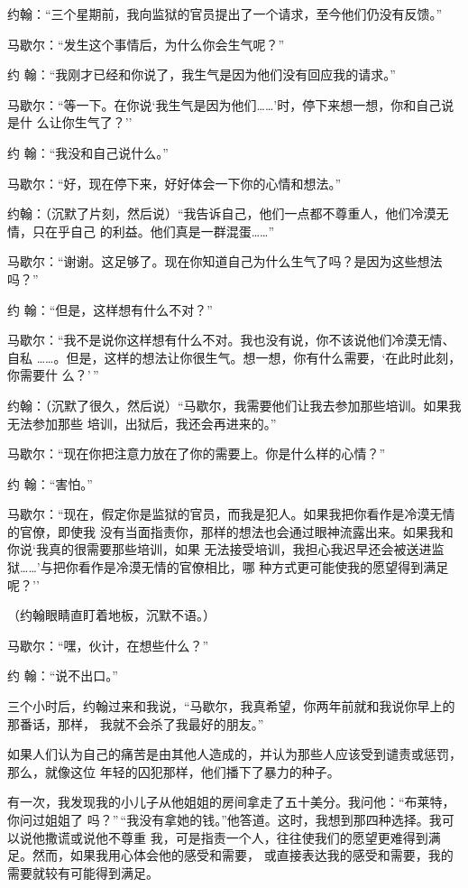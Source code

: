 \documentclass{ctexart}
\renewenvironment{quotation}{\setlength{\parskip}{0.5em}\setstretch{1.5}\kaishu\zihao{-5}\setlength{\parindent}{1em}}{\vspace{1em}}
\begin{document}
\begin{quotation}
	约翰：``三个星期前，我向监狱的官员提出了一个请求，至今他们仍没有反馈。''

	马歇尔：``发生这个事情后，为什么你会生气呢？''

	约 翰：``我刚才已经和你说了，我生气是因为他们没有回应我的请求。''

	马歇尔：``等一下。在你说`我生气是因为他们\ldots\ldots'时，停下来想一想，你和自己说是什
	么让你生气了？''

	约 翰：``我没和自己说什么。''

	马歇尔：``好，现在停下来，好好体会一下你的心情和想法。''

	约翰：（沉默了片刻，然后说）``我告诉自己，他们一点都不尊重人，他们冷漠无情，只在乎自己
	的利益。他们真是一群混蛋\ldots\ldots''

	马歇尔：``谢谢。这足够了。现在你知道自己为什么生气了吗？是因为这些想法吗？''

	约 翰：``但是，这样想有什么不对？''

	马歇尔：``我不是说你这样想有什么不对。我也没有说，你不该说他们冷漠无情、自私
	\ldots\ldots。但是，这样的想法让你很生气。想一想，你有什么需要，`在此时此刻，你需要什
	么？'\,''

	约翰：（沉默了很久，然后说）``马歇尔，我需要他们让我去参加那些培训。如果我无法参加那些
	培训，出狱后，我还会再进来的。''

	马歇尔：``现在你把注意力放在了你的需要上。你是什么样的心情？''

	约 翰：``害怕。''

	马歇尔：``现在，假定你是监狱的官员，而我是犯人。如果我把你看作是冷漠无情的官僚，即使我
	没有当面指责你，那样的想法也会通过眼神流露出来。如果我和你说`我真的很需要那些培训，如果
	无法接受培训，我担心我迟早还会被送进监狱\ldots\ldots'与把你看作是冷漠无情的官僚相比，哪
	种方式更可能使我的愿望得到满足呢？''

	（约翰眼睛直盯着地板，沉默不语。）

	马歇尔：``嘿，伙计，在想些什么？''

	约 翰：``说不出口。''
\end{quotation}

三个小时后，约翰过来和我说，``马歇尔，我真希望，你两年前就和我说你早上的那番话，那样，
我就不会杀了我最好的朋友。''

如果人们认为自己的痛苦是由其他人造成的，并认为那些人应该受到谴责或惩罚，那么，就像这位
年轻的囚犯那样，他们播下了暴力的种子。

有一次，我发现我的小儿子从他姐姐的房间拿走了五十美分。我问他：``布莱特，你问过姐姐了
吗？''\,``我没有拿她的钱。''他答道。这时，我想到那四种选择。我可以说他撒谎或说他不尊重
我，可是指责一个人，往往使我们的愿望更难得到满足。然而，如果我用心体会他的感受和需要，
或直接表达我的感受和需要，我的需要就较有可能得到满足。
\end{document}
